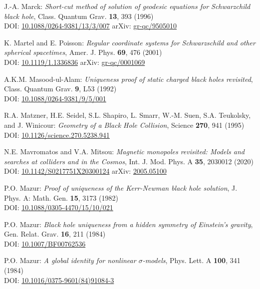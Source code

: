 \begin{thebibliography}{123}
J.-A. Marck:
{\em Short-cut method of solution of geodesic equations for Schwarzchild black hole},
Class. Quantum Grav. {\bf 13}, 393 (1996)\\
DOI: \href{https://doi.org/10.1088/0264-9381/13/3/007}{10.1088/0264-9381/13/3/007}\hfill
arXiv: \href{https://arxiv.org/abs/gr-qc/9505010}{gr-qc/9505010}

K. Martel and E. Poisson:
{\em Regular coordinate systems for Schwarzschild and other spherical spacetimes},
Amer. J. Phys. {\bf 69}, 476 (2001)\\
DOI: \href{https://doi.org/10.1119/1.1336836}{10.1119/1.1336836}\hfill
arXiv: \href{https://arxiv.org/abs/gr-qc/0001069}{gr-qc/0001069}

A.K.M. Masood-ul-Alam:
{\em Uniqueness proof of static charged black holes revisited},
Class. Quantum Grav. {\bf 9}, L53 (1992)\\
DOI: \href{https://doi.org/10.1088/0264-9381/9/5/001}{10.1088/0264-9381/9/5/001}

R.A. Matzner, H.E. Seidel, S.L. Shapiro, L. Smarr, W.-M. Suen, S.A. Teukolsky, and
J. Winicour: {\em Geometry of a Black Hole Collision},
Science {\bf 270}, 941 (1995)\\
DOI: \href{https://doi.org/10.1126/science.270.5238.941}{10.1126/science.270.5238.941}

N.E. Mavromatos and V.A. Mitsou:
{\em Magnetic monopoles revisited: Models and searches at colliders and in the Cosmos},
Int. J. Mod. Phys. A {\bf 35}, 2030012 (2020)\\
DOI: \href{https://doi.org/10.1142/S0217751X20300124}{10.1142/S0217751X20300124}\hfill
arXiv: \href{https://arxiv.org/abs/2005.05100}{2005.05100}

P.O. Mazur:
{\em Proof of uniqueness of the Kerr-Newman black hole solution},
J. Phys. A: Math. Gen. {\bf 15}, 3173 (1982)\\
DOI: \href{https://doi.org/10.1088/0305-4470/15/10/021}{10.1088/0305-4470/15/10/021}

P.O. Mazur:
{\em Black hole uniqueness from a hidden symmetry of Einstein's gravity},
Gen. Relat. Grav. {\bf 16}, 211 (1984)\\
DOI: \href{https://doi.org/10.1007/BF00762536}{10.1007/BF00762536}

P.O. Mazur:
{\em A global identity for nonlinear $\sigma$-models},
Phys. Lett. A {\bf 100}, 341 (1984)\\
DOI: \href{https://doi.org/10.1016/0375-9601(84)91084-3}{10.1016/0375-9601(84)91084-3}


\end{thebibliography}
